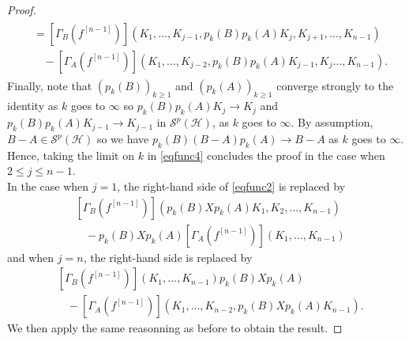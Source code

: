 \documentclass[12pt]{amsart}
\theoremstyle{remark}
\begin{document}
\begin{proof}
\begin{align}
\begin{split}
& = \left[ \Gamma_B(f^{[n-1]})\right](K_1, \ldots, K_{j-1}, p_k(B)p_k(A) K_j, K_{j+1}, \ldots, K_{n-1})\\
& \ \ \ \ - \left[ \Gamma_A(f^{[n-1]})\right](K_1, \ldots, K_{j-2}, p_k(B)p_k(A)K_{j-1}, K_j \ldots, K_{n-1}).
\end{split}
\end{align}
Finally, note that $(p_k(B))_{k\geq 1}$ and $(p_k(A))_{k\geq 1}$ converge strongly to the identity as $k$ goes to $\infty$ so $p_k(B)p_k(A) K_j \to K_j$ and $p_k(B)p_k(A)K_{j-1} \to K_{j-1}$ in $\mathcal{S}^p(\mathcal{H})$, as $k$ goes to $\infty$. By assumption, $B-A \in \mathcal{S}^p(\mathcal{H})$ so we have $p_k(B)(B-A)p_k(A) \to B-A$ as $k$ goes to $\infty$. Hence, taking the limit on $k$ in \eqref{eqfunc4} concludes the proof in the case when $2 \leq j \leq n-1$.\\

In the case when $j=1$, the right-hand side of \eqref{eqfunc2} is replaced by
\begin{align*}
& \left[ \Gamma_B (f^{[n-1]})\right](p_k(B)Xp_k(A)K_1, K_2, \ldots, K_{n-1})\\
& \ \ \ \ - p_k(B)Xp_k(A)\left[ \Gamma_A (f^{[n-1]})\right](K_1,\ldots, K_{n-1})
\end{align*}
and when $j=n$, the right-hand side is replaced by
\begin{align*}
& \left[ \Gamma_B (f^{[n-1]})\right](K_1, \ldots, K_{n-1})p_k(B)Xp_k(A)\\
& \ \ \ \ - \left[ \Gamma_A (f^{[n-1]})\right](K_1,\ldots, K_{n-2}, p_k(B)Xp_k(A)K_{n-1}).
\end{align*}
We then apply the same reasonning as before to obtain the result.

\end{proof}
\end{document}
